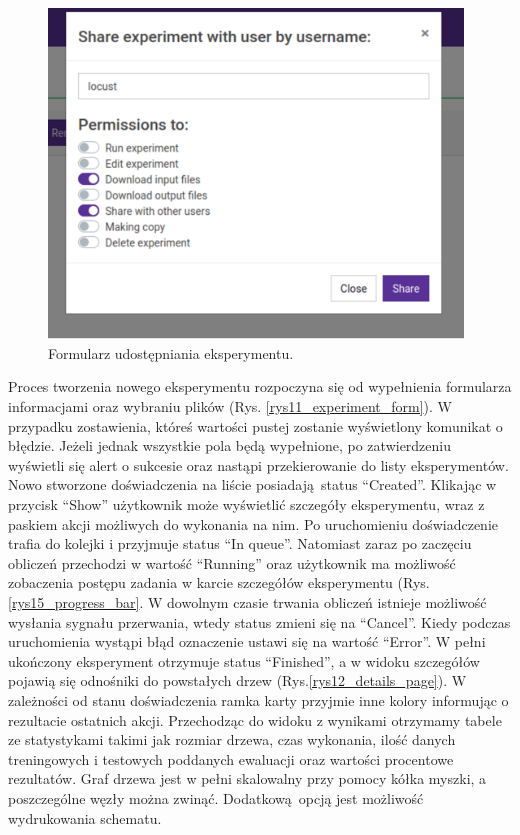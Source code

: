 \begin{figure}[htb]
	\centering
	\includegraphics[width=11cm]{grafika/share_form.eps}
	\caption{Formularz udostępniania eksperymentu.}
	\label{rys14_share_form}
\end{figure}


Proces tworzenia nowego eksperymentu rozpoczyna się od wypełnienia formularza informacjami oraz wybraniu plików (Rys. \ref{rys11_experiment_form}). W przypadku zostawienia, któreś wartości pustej zostanie wyświetlony komunikat o błędzie. Jeżeli jednak wszystkie pola będą wypełnione, po zatwierdzeniu wyświetli się alert o sukcesie oraz nastąpi przekierowanie do listy eksperymentów. Nowo stworzone doświadczenia na liście posiadają status \enquote{Created}. Klikając w przycisk \enquote{Show} użytkownik może wyświetlić szczegóły eksperymentu, wraz z paskiem akcji możliwych do wykonania na nim. Po uruchomieniu doświadczenie trafia do kolejki i przyjmuje status \enquote{In queue}. Natomiast zaraz po zaczęciu obliczeń przechodzi w wartość \enquote{Running} oraz użytkownik ma możliwość zobaczenia postępu zadania w karcie szczegółów eksperymentu (Rys. \ref{rys15_progress_bar}. W dowolnym czasie trwania obliczeń istnieje możliwość wysłania sygnału przerwania, wtedy status zmieni się na \enquote{Cancel}. Kiedy podczas uruchomienia wystąpi błąd oznaczenie ustawi się na wartość \enquote{Error}. W pełni ukończony eksperyment otrzymuje status \enquote{Finished}, a w widoku szczegółów pojawią się odnośniki do powstałych drzew (Rys.\ref{rys12_details_page}). W zależności od stanu doświadczenia ramka karty przyjmie inne kolory informując o rezultacie ostatnich akcji. Przechodząc do widoku z wynikami otrzymamy tabele ze statystykami takimi jak rozmiar drzewa, czas wykonania, ilość danych treningowych i testowych poddanych ewaluacji oraz wartości procentowe rezultatów. Graf drzewa jest w pełni skalowalny przy pomocy kółka myszki, a poszczególne węzły można zwinąć. Dodatkową opcją jest możliwość wydrukowania schematu.




